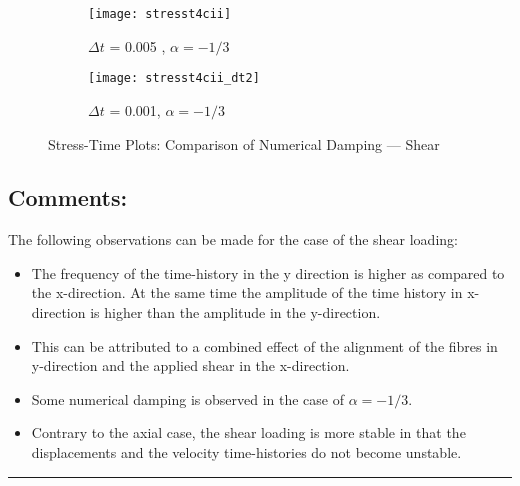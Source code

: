 \begin{figure}[htbp]
\centering
\begin{subfigure}{.5\textwidth}
  \centering
  \texttt{[image: stresst4cii]}
  \caption{$\Delta t$ = 0.005 , $\alpha = -1/3$}
  \label{fig:sub1}
\end{subfigure}%
\begin{subfigure}{.5\textwidth}
  \centering
  \texttt{[image: stresst4cii\_dt2]}
  \caption{$\Delta t$ = 0.001, $\alpha = -1/3$}
  \label{fig:sub2}
\end{subfigure}
\caption{ Stress-Time Plots: Comparison of Numerical Damping --- Shear }
\end{figure}
\newpage\subsection*{Comments: }
The following observations can be made for the case of the shear loading: 
\begin{itemize}
\item The frequency of the time-history in the y direction is higher as compared to the x-direction. At the same time the amplitude of the time history in x-direction is higher than the amplitude in the y-direction. 
\item This can be attributed to a combined effect of the alignment of the fibres in y-direction and the applied shear in the x-direction. 
\item Some numerical damping is observed in the case of $\alpha = -1/3$. 
\item Contrary to the axial case, the shear loading is more stable in that the displacements and the velocity time-histories do not become unstable. 
\end{itemize}\hrule
